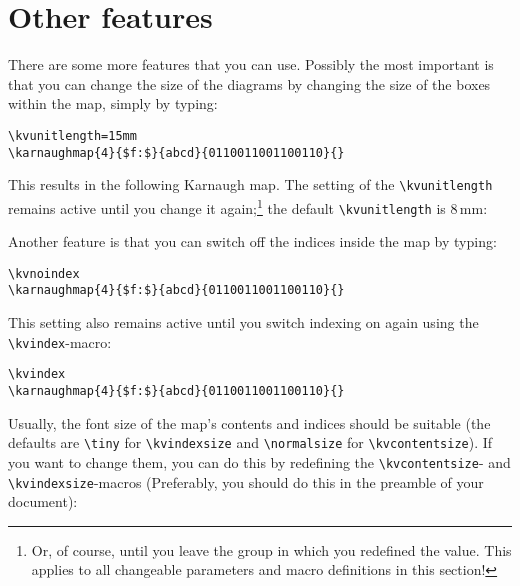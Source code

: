 \documentclass{article}
\begin{document}
\section{Other features}

There are some more features that you can use. Possibly the most important is
that  you can change the size of the diagrams by changing the size of the
boxes within the map, simply by typing:

\begin{verbatim}
\kvunitlength=15mm
\karnaughmap{4}{$f:$}{abcd}{0110011001100110}{}
\end{verbatim}

This results in the following Karnaugh map. The setting of the
\verb|\kvunitlength| remains active until you change it again;\footnote{Or, of
    course, until you leave the group in which you redefined the value. This
    applies to all changeable parameters and macro definitions in this section!}
the default \verb|\kvunitlength| is 8\,mm:

\begin{center}
    \kvunitlength=15mm
\end{center}

Another feature is that you can switch off the indices inside the map by
typing:

\begin{verbatim}
\kvnoindex
\karnaughmap{4}{$f:$}{abcd}{0110011001100110}{}
\end{verbatim}

\begin{center}
    \kvunitlength=8mm
    \kvnoindex
\end{center}

This setting also remains active until you switch indexing on again using the
\verb|\kvindex|-macro:

\begin{verbatim}
\kvindex
\karnaughmap{4}{$f:$}{abcd}{0110011001100110}{}
\end{verbatim}

\begin{center}
    \kvindex
\end{center}

Usually, the font size of the map's contents and indices should be
suitable (the defaults are \verb|\tiny| for \verb|\kvindexsize| and
\verb|\normalsize| for \verb|\kvcontentsize|). If you want to change them, you
can do this by redefining the \verb|\kvcontentsize|- and
\verb|\kvindexsize|-macros (Preferably, you should do this in the preamble of
your document):
\end{document}
